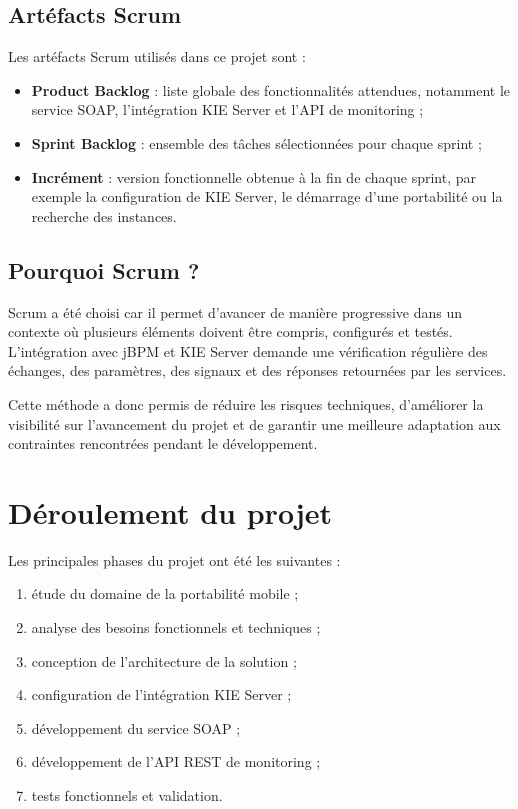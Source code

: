 \documentclass[12pt,a4paper]{report}
\begin{document}
\subsection{Artéfacts Scrum}
Les artéfacts Scrum utilisés dans ce projet sont :
\begin{itemize}
    \item \textbf{Product Backlog} : liste globale des fonctionnalités attendues, notamment le service SOAP, l'intégration KIE Server et l'API de monitoring ;
    \item \textbf{Sprint Backlog} : ensemble des tâches sélectionnées pour chaque sprint ;
    \item \textbf{Incrément} : version fonctionnelle obtenue à la fin de chaque sprint, par exemple la configuration de KIE Server, le démarrage d'une portabilité ou la recherche des instances.
\end{itemize}

\subsection{Pourquoi Scrum ?}
Scrum a été choisi car il permet d'avancer de manière progressive dans un contexte où plusieurs éléments doivent être compris, configurés et testés. L'intégration avec jBPM et KIE Server demande une vérification régulière des échanges, des paramètres, des signaux et des réponses retournées par les services.

Cette méthode a donc permis de réduire les risques techniques, d'améliorer la visibilité sur l'avancement du projet et de garantir une meilleure adaptation aux contraintes rencontrées pendant le développement.

\section{Déroulement du projet}
Les principales phases du projet ont été les suivantes :
\begin{enumerate}
    \item étude du domaine de la portabilité mobile ;
    \item analyse des besoins fonctionnels et techniques ;
    \item conception de l'architecture de la solution ;
    \item configuration de l'intégration KIE Server ;
    \item développement du service SOAP ;
    \item développement de l'API REST de monitoring ;
    \item tests fonctionnels et validation.
\end{enumerate}
\end{document}
